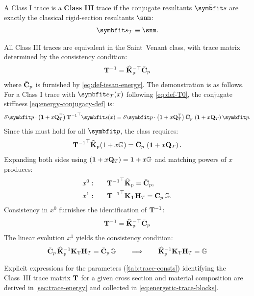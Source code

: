 \begin{definition}\label{def:class-iii}
A Class I trace is a \textbf{Class III} trace if the conjugate resultants \(\TraceTotalEnergyStress\) are exactly the classical rigid-section resultants \(\snm\):
\begin{equation}
    \TraceStress \equiv \snm .
    \label{eq:def-s3}
\end{equation}
\end{definition}

All Class III traces are equivalent in the Saint~Venant class, with trace matrix determined by the consistency condition:
\begin{equation}
{\mathbf{T}^{-1}} = \widehat{\mathbf{K}}_{\rm p}^{-\top} \bar{\mathbf{C}}_p
\label{eq:T0-formula}
\end{equation}
where \(\bar{\mathbf{C}}_p\) is furnished by \eqref{eq:def-iesan-energy}.
The demonstration is as follows. 
For a Class I trace with $\TraceStrain(x)$ following \eqref{eq:def-T0}, 
the conjugate stiffness \eqref{eq:energy-conjugacy-def} is:
\begin{equation*}
\delta\bm{p}\cdot \left(\mathbf{1} + x\TraceEvolveEP^\top\right) \TraceDeDpRoot^\top \bm{s}(x) 
= \delta\bm{p}\cdot \left(\mathbf{1} + x\TraceEvolveEP^\top\right) \IesanEnergy\, \left(\mathbf{1} + x\TraceEvolveEP\right) \bm{p}.
\end{equation*}
Since this must hold for all $\IesanVector$, the class requires:
\begin{equation*}
{\mathbf{T}^{-1}}^\top \widehat{\mathbf{K}}_{\rm p}(1+x\mathbb{G}) = \bar{\mathbf{C}}_p\, \left(\mathbf{1} + x\mathbf{Q}_T\right).
\end{equation*} 
Expanding both sides using $\left(\mathbf{1} + x\mathbf{Q}_T\right) = \mathbf{1} + x\mathbb{G}$ and 
matching powers of $x$ produces:
\begin{align*}
x^0: \qquad & \TraceDeDpRoot^\top \IesanStiff = \IesanEnergy, 
\\ %
x^1: \qquad & \TraceDeDpRoot^\top 
\TraceStiffNM\TraceDeDpOne%
= \IesanEnergy\,\IesanEvolveSP.
\end{align*}
Consistency in \(x^0\) furnishes the identification of \({\mathbf{T}^{-1}}\):
\begin{equation*}
{\mathbf{T}^{-1}} = \widehat{\mathbf{K}}_{\rm p}^{-\top} \bar{\mathbf{C}}_p
\end{equation*}
The linear evolution \(x^1\) yields the consistency condition:
\begin{equation}
\IesanEnergy\,\IesanStiff^{-1} 
\TraceStiffNM\TraceDeDpOne%
= \IesanEnergy\,\IesanEvolveSP
\qquad \Longrightarrow \qquad 
\IesanStiff^{-1} 
\TraceStiffNM\TraceDeDpOne%
= \IesanEvolveSP
\label{eq:consistency-condition}
\end{equation}

Explicit expressions for the parameters (\cref{tab:trace-consts}) identifying the Class~III trace matrix \(\mathbf{T}\) for a given cross section and material composition are derived in \cref{sec:trace-energy} and collected in \eqref{eq:energetic-trace-blocks}.